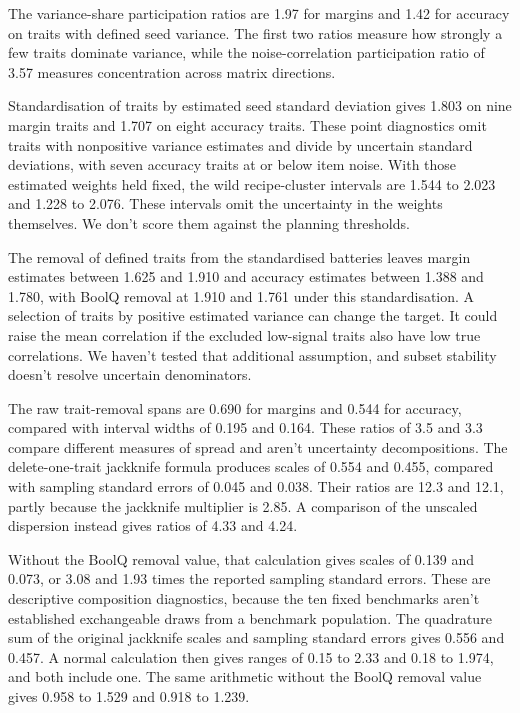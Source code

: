 The variance-share participation ratios are 1.97 for margins and 1.42 for accuracy on traits with defined seed variance. The first two ratios measure how strongly a few traits dominate variance, while the noise-correlation participation ratio of 3.57 measures concentration across matrix directions.

Standardisation of traits by estimated seed standard deviation gives 1.803 on nine margin traits and 1.707 on eight accuracy traits. These point diagnostics omit traits with nonpositive variance estimates and divide by uncertain standard deviations, with seven accuracy traits at or below item noise. With those estimated weights held fixed, the wild recipe-cluster intervals are 1.544 to 2.023 and 1.228 to 2.076. These intervals omit the uncertainty in the weights themselves. We don't score them against the planning thresholds.

The removal of defined traits from the standardised batteries leaves margin estimates between 1.625 and 1.910 and accuracy estimates between 1.388 and 1.780, with BoolQ removal at 1.910 and 1.761 under this standardisation. A selection of traits by positive estimated variance can change the target. It could raise the mean correlation if the excluded low-signal traits also have low true correlations. We haven't tested that additional assumption, and subset stability doesn't resolve uncertain denominators.

The raw trait-removal spans are 0.690 for margins and 0.544 for accuracy, compared with interval widths of 0.195 and 0.164. These ratios of 3.5 and 3.3 compare different measures of spread and aren't uncertainty decompositions. The delete-one-trait jackknife formula produces scales of 0.554 and 0.455, compared with sampling standard errors of 0.045 and 0.038. Their ratios are 12.3 and 12.1, partly because the jackknife multiplier is 2.85. A comparison of the unscaled dispersion instead gives ratios of 4.33 and 4.24.

Without the BoolQ removal value, that calculation gives scales of 0.139 and 0.073, or 3.08 and 1.93 times the reported sampling standard errors. These are descriptive composition diagnostics, because the ten fixed benchmarks aren't established exchangeable draws from a benchmark population. The quadrature sum of the original jackknife scales and sampling standard errors gives 0.556 and 0.457. A normal calculation then gives ranges of 0.15 to 2.33 and 0.18 to 1.974, and both include one. The same arithmetic without the BoolQ removal value gives 0.958 to 1.529 and 0.918 to 1.239.

